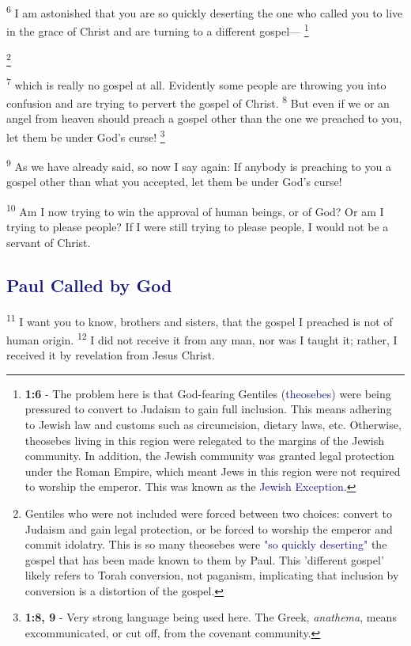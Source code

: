 \documentclass[12pt,twoside]{article}
\newcommand{\vs}[1]{\textsuperscript{#1}}
\newcommand{\vnote}[2]{%
  \begingroup
  \renewcommand\thefootnote{}%
  \footnote{\scriptsize \textbf{}#2}%
  \addtocounter{footnote}{-1}%
  \endgroup
}
\begin{document}
\hspace{0.5cm} \vs{6} I am astonished that you are so quickly deserting the one who called you to live in the grace of Christ and are turning to a different gospel---\vnote{6}{\textbf{1:6} - The problem here is that God-fearing Gentiles (\textcolor{MidnightBlue}{theosebes}) were being pressured to convert to Judaism to gain full inclusion. This means adhering to Jewish law and customs such as circumcision, dietary laws, etc. Otherwise, theosebes living in this region were relegated to the margins of the Jewish community. In addition, the Jewish community was granted legal protection under the Roman Empire, which meant Jews in this region were not required to worship the emperor. This was known as the \textcolor{MidnightBlue}{Jewish Exception}.}

\vnote{6}{Gentiles who were not included were forced between two choices: convert to Judaism and gain legal protection, or be forced to worship the emperor and commit idolatry. This is so many theosebes were \textcolor{MidnightBlue}{"so quickly deserting"} the gospel that has been made known to them by Paul. This 'different gospel' likely refers to Torah conversion, not paganism, implicating that inclusion by conversion is a distortion of the gospel.}
\vs{7} which is really no gospel at all. Evidently some people are throwing you into confusion and are trying to pervert the gospel of Christ.
\vs{8} But even if we or an angel from heaven should preach a gospel other than the one we preached to you, let them be under God's curse!\vnote{8}{\textbf{1:8, 9} - Very strong language being used here. The Greek, \textit{anathema}, means excommunicated, or cut off, from the covenant community.}
\vs{9} As we have already said, so now I say again: If anybody is preaching to you a gospel other than what you accepted, let them be under God's curse!

\vs{10} Am I now trying to win the approval of human beings, or of God? Or am I trying to please people? If I were still trying to please people, I would not be a servant of Christ.

\subsection*{\textcolor{MidnightBlue}{\textbf{Paul Called by God}}}

\hspace{0.5cm} \vs{11} I want you to know, brothers and sisters, that the gospel I preached is not of human origin.
\vs{12} I did not receive it from any man, nor was I taught it; rather, I received it by revelation from Jesus Christ.
\end{document}
